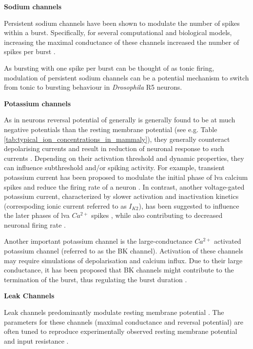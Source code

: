 \documentclass[../main.tex]{subfiles}
\begin{document}
\noindent\textbf{Sodium channels}

Persistent sodium channels have been shown to modulate the number of spikes within a burst. Specifically, for several computational and biological models, increasing the maximal conductance of these channels increased the number of spikes per burst \cite{liuMultipleConductancesCooperatively2008,golombContributionPersistentNa2006}.

As bursting with one spike per burst can be thought of as tonic firing, modulation of persistent sodium channels can be a potential mechanism to switch from tonic to bursting behaviour in \textit{Drosophila} R5 neurons.

\noindent\textbf{Potassium channels}

As in neurons reversal potential of generally is generally found to be at much negative potentials than the resting membrane potential (see e.g. Table \ref{tab:typical_ion_concentrations_in_mammaly}), they generally counteract depolarising currents and result in reduction of neuronal response to such currents \cite{mccormickModelElectrophysiologicalProperties1992}. Depending on their activation threshold and dynamic properties, they can influence subthreshold and/or spiking activity. For example, transient potassium current has been proposed to modulate the initial phase of \gls{lva} calcium spikes \cite{huguenardSimulationCurrentsInvolved1992} and reduce the firing rate of a neuron \cite{mccormickModelElectrophysiologicalProperties1992}. In contrast, another voltage-gated potassium current, characterized by slower activation and inactivation kinetics (correspoding ionic current referred to as $I_{K2}$), has been suggested to influence the later phases of \gls{lva} $Ca^{2+}$ spikes \cite{huguenardSimulationCurrentsInvolved1992}, while also contributing to decreased neuronal firing rate \cite{mccormickModelElectrophysiologicalProperties1992}.

Another important potassium channel is the large-conductance $Ca^{2+}$ activated potassium channel (referred to as the BK channel). Activation of these channels may require simulations of depolarisation and calcium influx. Due to their large conductance, it has been proposed that BK channels might contribute to the termination of the burst, thus regulating the burst
duration \cite{liuMultipleConductancesCooperatively2008}.

\noindent\textbf{Leak Channels}

Leak channels predominantly modulate resting membrane potential \cite{mccormickModelElectrophysiologicalProperties1992,amarilloInterplaySevenSubthreshold2014}. The parameters for these channels (maximal conductance and reversal potential) are often tuned to reproduce experimentally observed resting membrane potential and input resistance \cite{wangMultipleDynamicalModes1994}.
\end{document}
